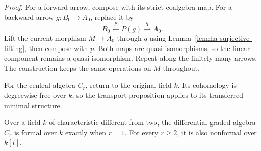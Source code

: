 \begin{proof}
For a forward arrow, compose with its strict coalgebra map.
For a backward arrow $g:B_0\to A_0$, replace it by
\[
 B_0\xleftarrow{\ p\ }P(g)\xrightarrow{\ q\ }A_0.
\]
Lift the current morphism $M\to A_0$ through $q$ using
Lemma~\ref{lem:ha-surjective-lifting}, then compose with $p$.
Both maps are quasi-isomorphisms, so the linear component remains
a quasi-isomorphism. Repeat along the finitely many arrows.
The construction keeps the same operations on $M$ throughout.
\end{proof}

For the central algebra $C_r$, return to the original field $k$.
Its cohomology is degreewise free over $k$, so the transport
proposition applies to its transferred minimal structure.

\begin{theorem}\label{thm:ha-formality-dichotomy}
Over a field $k$ of characteristic different from two, the differential graded algebra
$C_r$ is formal over $k$ exactly when $r=1$.
For every $r\geq2$, it is also nonformal over $k[t]$.
\end{theorem}

